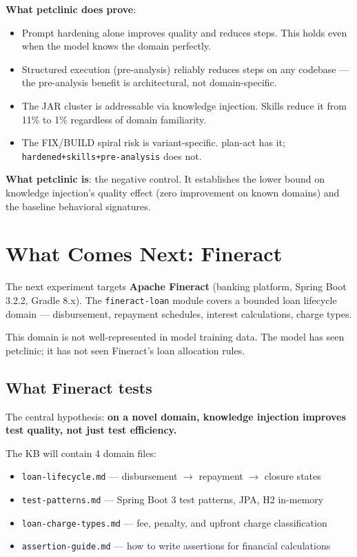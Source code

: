 \documentclass[11pt,a4paper]{article}
\begin{document}
\textbf{What petclinic does prove}:

\begin{itemize}
  \item Prompt hardening alone improves quality and reduces steps.
    This holds even when the model knows the domain perfectly.
  \item Structured execution (pre-analysis) reliably reduces steps on any codebase ---
    the pre-analysis benefit is architectural, not domain-specific.
  \item The JAR cluster is addressable via knowledge injection.
    Skills reduce it from 11\% to 1\% regardless of domain familiarity.
  \item The FIX/BUILD spiral risk is variant-specific.
    plan-act has it; \texttt{hardened+skills+pre-analysis} does not.
\end{itemize}

\textbf{What petclinic is}: the negative control.
It establishes the lower bound on knowledge injection's quality effect
(zero improvement on known domains) and the baseline behavioral signatures.

\section{What Comes Next: Fineract}
\label{sec:fineract}

The next experiment targets \textbf{Apache Fineract} (banking platform, Spring Boot 3.2.2,
Gradle 8.x). The \texttt{fineract-loan} module covers a bounded loan lifecycle domain ---
disbursement, repayment schedules, interest calculations, charge types.

This domain is not well-represented in model training data.
The model has seen petclinic; it has not seen Fineract's loan allocation rules.

\subsection*{What Fineract tests}

The central hypothesis: \textbf{on a novel domain, knowledge injection improves
test quality, not just test efficiency.}

The KB will contain 4 domain files:
\begin{itemize}
  \item \texttt{loan-lifecycle.md} --- disbursement $\to$ repayment $\to$ closure states
  \item \texttt{test-patterns.md} --- Spring Boot 3 test patterns, JPA, H2 in-memory
  \item \texttt{loan-charge-types.md} --- fee, penalty, and upfront charge classification
  \item \texttt{assertion-guide.md} --- how to write assertions for financial calculations
\end{itemize}
\end{document}
